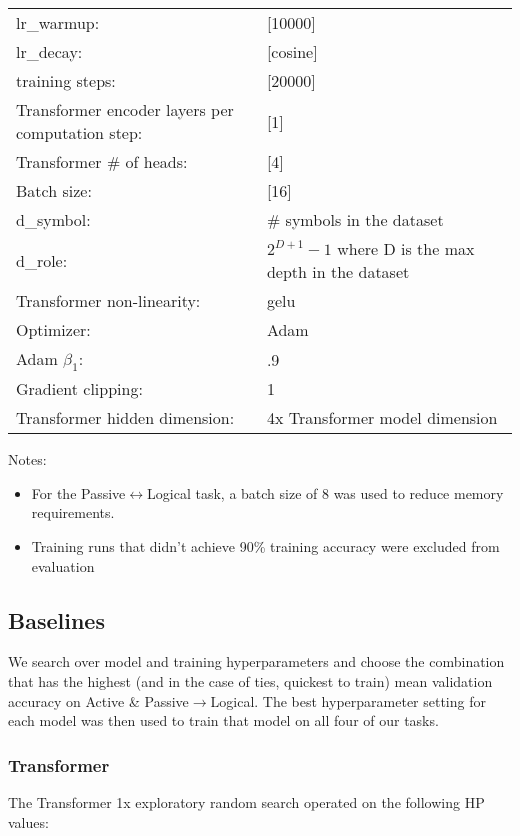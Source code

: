 \begin{tabular}{ll}
    lr\_warmup: & [10000] \\
     lr\_decay: & [cosine] \\
     training steps: & [20000] \\
     Transformer encoder layers per computation step: & [1] \\
     Transformer \# of heads: & [4] \\
     Batch size: & [16] \\
     d\_symbol: & \# symbols in the dataset \\
     d\_role: & $2^{D+1}-1$ where D is the max depth in the dataset \\
     Transformer non-linearity: & gelu \\
     Optimizer: & Adam \\
     Adam $\beta_1$: & .9 \\
     Gradient clipping: & 1 \\
     Transformer hidden dimension: & 4x Transformer model dimension \\
\end{tabular}

Notes:

\begin{itemize}
\item For the Passive$\leftrightarrow$Logical task, a batch size of 8 was used to reduce memory requirements. 
\item Training runs that didn't achieve 90\% training accuracy were excluded from evaluation 
\end{itemize}

\pagebreak
\subsection{Baselines} \label{sec:dtm-baseline-training}

We search over model and training hyperparameters and choose the combination that has the highest (and in the case of ties, quickest to train) mean validation accuracy on Active \& Passive$\rightarrow$Logical. The best hyperparameter setting for each model was then used to train that model on all four of our tasks.  


\subsubsection{Transformer}

The Transformer 1x exploratory random search operated on the following HP values: 

